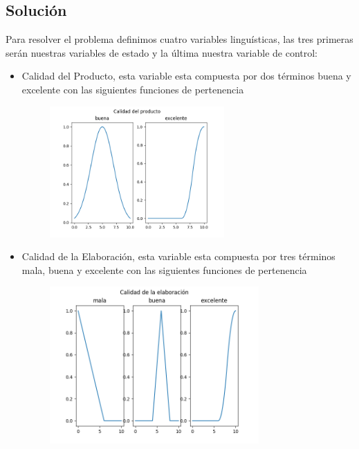 \documentclass[12pt]{article}
\begin{document}
\subsection{Soluci\'on}
Para resolver el problema definimos cuatro variables lingu\'isticas, las tres primeras ser\'an nuestras variables de estado y la \'ultima nuestra variable de control:
\begin{itemize}
	\item Calidad del Producto, esta variable esta compuesta por dos t\'erminos buena y excelente con las siguientes funciones de pertenencia
	\begin{figure}[H]
		\centering
		\includegraphics[width=0.8\linewidth, height=5cm ]{product.png}
	\end{figure}

	\item Calidad de la Elaboraci\'on, esta variable esta compuesta por tres t\'erminos mala, buena y excelente con las siguientes funciones de pertenencia
	\begin{figure}[!h]
		\centering
		\includegraphics[width=0.9\linewidth, height=6cm ]{cook.png}
	\end{figure}


\end{itemize}
\end{document}
